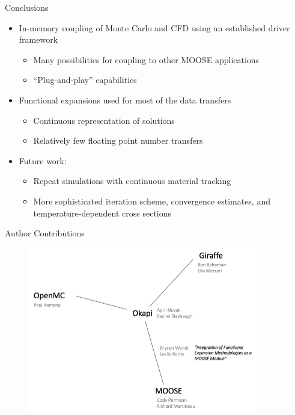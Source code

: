 \documentclass[10pt]{beamer}
\begin{document}
\begin{frame}{Conclusions}
\begin{itemize}
\item In-memory coupling of Monte Carlo and CFD using an established driver framework
	\begin{itemize}
	\item Many possibilities for coupling to other MOOSE applications
	\item ``Plug-and-play'' capabilities \newline
	\end{itemize}
\item Functional expansions used for most of the data transfers
	\begin{itemize}
	\item Continuous representation of solutions
	\item Relatively few floating point number transfers\newline
	\end{itemize}
\item Future work:
	\begin{itemize}
	\item Repeat simulations with continuous material tracking
	\item More sophisticated iteration scheme, convergence estimates, and temperature-dependent cross sections
	\end{itemize}
\end{itemize}
\end{frame}

\begin{frame}{Author Contributions}
\begin{figure}
\includegraphics[width=10cm]{../Figures/work_division.png}
\end{figure}
\end{frame}
\end{document}
